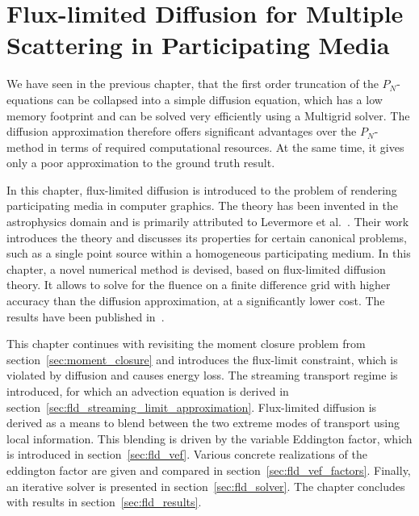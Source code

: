 \chapter{Flux-limited Diffusion for Multiple Scattering in Participating Media}
\label{sec:fld}

We have seen in the previous chapter, that the first order truncation of the $P_N$-equations can be collapsed into a simple diffusion equation, which has a low memory footprint and can be solved very efficiently using a Multigrid solver. The diffusion approximation therefore offers significant advantages over the $P_N$-method in terms of required computational resources. At the same time, it gives only a poor approximation to the ground truth result.

In this chapter, flux-limited diffusion is introduced to the problem of rendering participating media in computer graphics. The theory has been invented in the astrophysics domain and is primarily attributed to Levermore et al.~\cite{Levermore81}. Their work introduces the theory and discusses its properties for certain canonical problems, such as a single point source within a homogeneous participating medium. In this chapter, a novel numerical method is devised, based on flux-limited diffusion theory. It allows to solve for the fluence on a finite difference grid with higher accuracy than the diffusion approximation, at a significantly lower cost. The results have been published in~\cite{Koerner14}.

This chapter continues with revisiting the moment closure problem from section~\ref{sec:moment_closure} and introduces the flux-limit constraint, which is violated by diffusion and causes energy loss. The streaming transport regime is introduced, for which an advection equation is derived in section~\ref{sec:fld_streaming_limit_approximation}. Flux-limited diffusion is derived as a means to blend between the two extreme modes of transport using local information. This blending is driven by the variable Eddington factor, which is introduced in section~\ref{sec:fld_vef}. Various concrete realizations of the eddington factor are given and compared in section~\ref{sec:fld_vef_factors}. Finally, an iterative solver is presented in section~\ref{sec:fld_solver}. The chapter concludes with results in section~\ref{sec:fld_results}.












